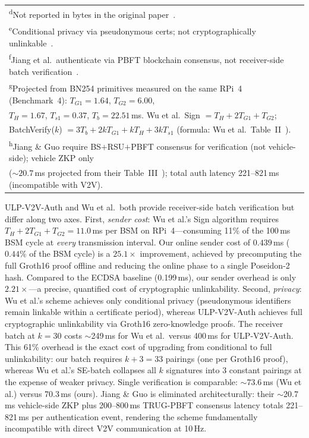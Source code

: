 \begin{table}[t]
{\begin{tabular}{@{}lcccc@{}}
\multicolumn{5}{l}{\textsuperscript{d}Not reported in bytes in the original paper~\cite{jiang2024}.} \\
\multicolumn{5}{l}{\textsuperscript{e}Conditional privacy via pseudonymous certs; not cryptographically unlinkable~\cite{zhang2024}.} \\
\multicolumn{5}{l}{\textsuperscript{f}Jiang et al.\ authenticate via PBFT blockchain consensus, not receiver-side batch verification~\cite{jiang2024}.} \\
\multicolumn{5}{l}{\textsuperscript{g}Projected from BN254 primitives measured on the same RPi~4 (Benchmark~4): $T_{G1}{=}1.64$, $T_{G2}{=}6.00$,} \\
\multicolumn{5}{l}{\quad $T_H{=}1.67$, $T_{s1}{=}0.37$, $T_b{=}22.51$\,ms. Wu et al.\ Sign $= T_H{+}2T_{G1}{+}T_{G2}$;} \\
\multicolumn{5}{l}{\quad BatchVerify($k$) $= 3T_b + 2kT_{G1} + kT_H + 3kT_{s1}$ (formula: Wu et al.\ Table~II~\cite{zhang2024}).} \\
\multicolumn{5}{l}{\textsuperscript{h}Jiang \& Guo require BS$+$RSU$+$PBFT consensus for verification (not vehicle-side); vehicle ZKP only} \\
\multicolumn{5}{l}{\quad (${\sim}20.7$\,ms projected from their Table~III~\cite{jiang2024}); total auth latency 221--821\,ms (incompatible with V2V).} \\
\end{tabular}%
}
\end{table}

ULP-V2V-Auth and Wu et al.\ both provide receiver-side batch verification but
differ along two axes. First, \emph{sender cost}: Wu et al.'s Sign algorithm
requires $T_H + 2T_{G1} + T_{G2} = 11.0$\,ms per BSM on RPi~4---consuming
11\% of the 100\,ms BSM cycle at \emph{every} transmission interval. Our
online sender cost of $0.439$\,ms ($0.44\%$ of the BSM cycle) is a
$\mathbf{25.1\times}$ improvement, achieved by precomputing the full Groth16
proof offline and reducing the online phase to a single Poseidon-2 hash.
Compared to the ECDSA baseline (0.199\,ms), our sender overhead is only
$2.21\times$---a precise, quantified cost of cryptographic unlinkability.
Second, \emph{privacy}: Wu et al.'s scheme achieves only conditional privacy
(pseudonymous identifiers remain linkable within a certificate period), whereas
ULP-V2V-Auth achieves full cryptographic unlinkability via Groth16
zero-knowledge proofs. The receiver batch at $k=30$ costs $\sim$249\,ms for
Wu et al.\ versus 400\,ms for ULP-V2V-Auth. This 61\% overhead is the exact
cost of upgrading from conditional to full unlinkability: our batch requires
$k{+}3 = 33$ pairings (one per Groth16 proof), whereas Wu et al.'s SE-batch
collapses all $k$ signatures into 3 constant pairings at the expense of
weaker privacy. Single verification is comparable: $\sim$73.6\,ms (Wu et al.)
versus 70.3\,ms (ours). Jiang \& Guo is eliminated architecturally: their
$\sim$20.7\,ms vehicle-side ZKP plus 200--800\,ms TRUG-PBFT consensus latency
totals 221--821\,ms per authentication event, rendering the scheme fundamentally
incompatible with direct V2V communication at 10\,Hz.
